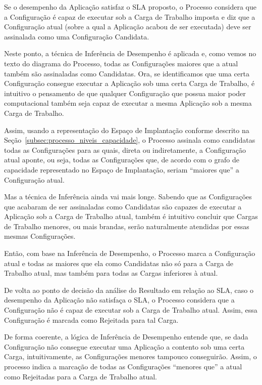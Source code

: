 Se o desempenho da Aplicação satisfaz o SLA proposto, o Processo considera que a
Configuração é capaz de executar sob a Carga de Trabalho imposta e diz que a 
Configuração atual (sobre a qual a Aplicação acabou de ser executada) deve ser
assinalada como uma Configuração Candidata.

Neste ponto, a técnica de Inferência de Desempenho é aplicada e, como vemos
no texto do diagrama do Processo, todas as Configurações maiores que a atual também
são assinaladas como Candidatas. Ora, se identificamos que uma certa Configuração
consegue executar a Aplicação sob uma certa Carga de Trabalho, é intuitivo o 
pensamento de que qualquer Configuração que possua maior poder computacional 
também seja capaz de executar a mesma Aplicação sob a mesma Carga de Trabalho.

Assim, usando a representação do Espaço de Implantação conforme descrito na
Seção~\ref{subsec:processo_niveis_capacidade}, o Processo assinala como candidatas
todas as Configurações para as quais, direta ou indiretamente, a Configuração 
atual aponte, ou seja, todas as Configurações que, de acordo com o grafo de capacidade representado no Espaço de Implantação, seriam ``maiores que'' a Configuração atual. 

Mas a técnica de Inferência ainda vai mais longe. Sabendo que as Configurações
que acabaram de ser assinaladas como Candidatas são capazes de executar a Aplicação
sob a Carga de Trabalho atual, também é intuitivo concluir que Cargas de Trabalho 
menores, ou mais brandas, serão naturalmente atendidas por essas mesmas Configurações.

Então, com base na Inferência de Desempenho, o Processo marca
a Configuração atual e todas as maiores que ela como Candidatas não só para a 
Carga de Trabalho atual, mas também para todas as Cargas inferiores à atual.

De volta ao ponto de decisão da análise do Resultado em relação ao SLA, caso o 
desempenho da Aplicação não satisfaça o SLA, o Processo considera que a 
Configuração não é capaz de executar sob a Carga de Trabalho atual. Assim, essa
Configuração é marcada como Rejeitada para tal Carga.

De forma coerente, a lógica de Inferência de Desempenho entende que, se dada 
Configuração não consegue executar uma Aplicação a contento sob uma certa Carga,
intuitivamente, as Configurações menores tampouco conseguirão. Assim, o processo
indica a marcação de todas as Configurações ``menores que'' a atual como 
Rejeitadas para a Carga de Trabalho atual. 

